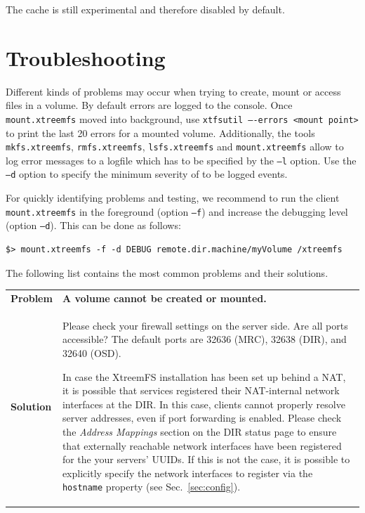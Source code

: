 \documentclass[a4paper,10pt]{book}
\begin{document}
The cache is still experimental and therefore disabled by default.

\section{Troubleshooting}

Different kinds of problems may occur when trying to create, mount or access files in a volume. By default errors are logged to the console. Once \texttt{mount.xtreemfs} moved into background, use \texttt{xtfsutil ----errors <mount point>} to print the last 20 errors for a mounted volume. Additionally, the tools \texttt{mkfs.xtreemfs}, \texttt{rmfs.xtreemfs}, \texttt{lsfs.xtreemfs} and \texttt{mount.xtreemfs} allow to log error messages to a logfile which has to be specified by the \texttt{--l} option. Use the \texttt{--d} option to specify the minimum severity of to be logged events.

For quickly identifying problems and testing, we recommend to run the client \texttt{mount.xtreemfs} in the foreground (option \texttt{--f}) and increase the debugging level (option \texttt{--d}). This can be done as follows:

\begin{verbatim}
$> mount.xtreemfs -f -d DEBUG remote.dir.machine/myVolume /xtreemfs
\end{verbatim}

The following list contains the most common problems and their solutions.

\begin{tabular}{lp{10cm}}
 \textbf{Problem}  & \textbf{A volume cannot be created or mounted.} \\
 \textbf{Solution} & Please check your firewall settings on the server side. Are all ports accessible? The default ports are 32636 (MRC), 32638 (DIR), and 32640 (OSD).

 In case the XtreemFS installation has been set up behind a NAT, it is possible that services registered their NAT-internal network interfaces at the DIR. In this case, clients cannot properly resolve server addresses, even if port forwarding is enabled. Please check the \emph{Address Mappings} section on the DIR status page to ensure that externally reachable network interfaces have been registered for the your servers' UUIDs. If this is not the case, it is possible to explicitly specify the network interfaces to register via the \texttt{hostname} property (see Sec.\ \ref{sec:config}).
\end{tabular}
\end{document}
